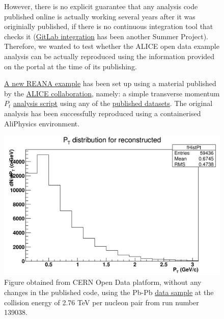 \begin{figure}[H]
    \centering
    \begin{minipage}[H]{0.49\textwidth}
However, there is no explicit guarantee that any analysis code published online is actually working several years after it was originially published, if there is no continuous integration tool that checks it (\href{https://github.com/orgs/reanahub/projects/4}{GitLab integration} has been another Summer Project). Therefore, we wanted to test whether the ALICE open data example analysis can be actually reproduced using the information provided on the portal at the time of its publishing.\\

\vspace{1em}

\href{https://github.com/reanahub/reana-demo-alice-pt-analysis}{A new REANA example} has been set up using a material published by the \href{http://aliceinfo.cern.ch/Public/Welcome.html}{ALICE collaboration}, namely: a simple transverse momentum $P_t$  \href{http://opendata.cern.ch/record/1200}{analysis script} using any of the \href{http://opendata.cern.ch/search?page=1&size=20&experiment=ALICE&type=Dataset&subtype=Collision&subtype=Derived}{published datasets}. The original analysis has been successfully reproduced using a containerised AliPhysics environment.

     \end{minipage}
 \hfill
    \begin{minipage}[H]{0.49\textwidth}
        \centering
        \includegraphics[width=1.0\textwidth]{figures/aliceplot_pt.png}
        \caption{Figure obtained from CERN Open Data platform, without any changes in the published code, using the Pb-Pb \href{http://opendata.cern.ch/record/1102}{data sample} at the collision energy of 2.76 TeV per nucleon pair from run number 139038.}
        \label{fig:alice_pt_distribution}
     \end{minipage}
\end{figure}

